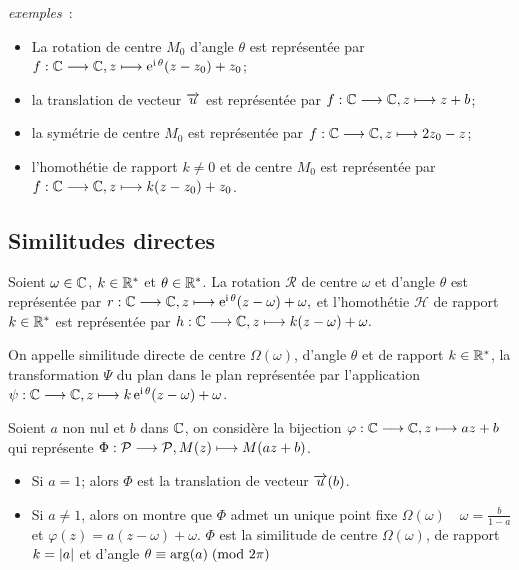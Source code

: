 \emph{exemples}~:
\begin{itemize}
    \item La rotation de centre \(M_0\) d'angle \(\theta\) est représentée par 
        \(f:\mathbb{C} \longrightarrow \mathbb{C}, z \longmapsto \operatorname{e}^{\operatorname{i} \theta}(z-z_0)  + z_0\);
    \item la translation de vecteur \(\overrightarrow{u}\) est représentée par 
        \(f:\mathbb{C} \longrightarrow \mathbb{C}, z \longmapsto z + b\);
    \item la symétrie de centre \(M_0\) est représentée par 
        \(f:\mathbb{C} \longrightarrow \mathbb{C}, z \longmapsto 2z_0-z\);
    \item l'homothétie de rapport \(k\neq 0\) et de centre \(M_0\) est 
        représentée par \(f:\mathbb{C} \longrightarrow \mathbb{C}, z \longmapsto k(z-z_0) + z_0\).
\end{itemize}

\subsection{Similitudes directes}
\label{subsec:simdirecte}

Soient \(\omega \in \mathbb{C}\), \(k\in \mathbb{R}^*\) et \(\theta \in \mathbb{R}^*\). La rotation 
\(\mathcal{R}\) de centre \(\omega\) et d'angle \(\theta\) est représentée par 
\(r:\mathbb{C} \longrightarrow \mathbb{C}, z \longmapsto \operatorname{e}^{\operatorname{i} \theta}(z-\omega) + \omega,\) et l'homothétie 
\(\mathcal{H}\) de rapport \(k \in \mathbb{R}^*\) est représentée par 
\(h:\mathbb{C} \longrightarrow \mathbb{C}, z \longmapsto k(z-\omega) + \omega.\)

\begin{defdef}
    On appelle similitude directe de centre \(\Omega(\omega)\), d'angle 
    \(\theta\) et de rapport \(k \in \mathbb{R}^*\), la transformation \(\Psi\) du plan 
    dans le plan représentée par l'application 
    \(\psi:\mathbb{C} \longrightarrow \mathbb{C}, z \longmapsto k \operatorname{e}^{\operatorname{i} \theta}(z-\omega) + \omega\).
\end{defdef}
Soient \(a\) non nul et \(b\) dans \(\mathbb{C}\), on considère la bijection 
\(\varphi:\mathbb{C} \longrightarrow \mathbb{C}, z \longmapsto az + b\) qui représente 
\(\Phi:\mathcal{P} \longrightarrow \mathcal{P}, M(z) \longmapsto M(az + b)\).

\begin{itemize}
    \item Si \(a = 1\); alors  \(\Phi\) est la translation de vecteur \(\overrightarrow{u}(b)\).
    \item Si \(a \neq 1\), alors on montre que \(\Phi\) admet un unique point 
        fixe \(\Omega(\omega) \quad \omega = \frac{b}{1-a}\) et 
        \(\varphi(z) = a(z-\omega) + \omega\).
        \(\Phi\) est la similitude de centre \(\Omega(\omega)\), de rapport 
        \(k = \left\lvert a\right\rvert\) et d'angle \(\theta \equiv \arg(a)\!\pmod {2\pi}\)
\end{itemize}

